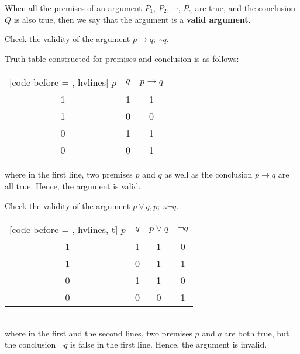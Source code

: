 \documentclass{report}
\newcounter{example}
\begin{document}
When all the premises of an argument $P_1$, $P_2$, $\cdots$, $P_n$ are true,
and the conclusion $Q$ is also true, then we say that the argument is a
\textbf{valid argument}. \vspace{0.5cm}
\begin{example}
    \item Check the validity of the argument $p \rightarrow q;\ \therefore q$.
\end{example}
\begin{solution}
    \item Truth table constructed for premises and conclusion is as follows:
    \begin{center}
        \begin{NiceTabular}{|c|c|c|}[code-before = , hvlines]
            $p$ & $q$ & $p \rightarrow q$ \\
            1   & 1   & 1                 \\
            1   & 0   & 0                 \\
            0   & 1   & 1                 \\
            0   & 0   & 1                 \\
        \end{NiceTabular}
    \end{center}
    where in the first line, two premises $p$ and $q$ as well as the conclusion $p \rightarrow q$ are all true. Hence, the argument is valid.
\end{solution}
\newpage
\begin{example}
    \item Check the validity of the argument $p \lor q, p;\ \therefore \neg q$.
\end{example}
\begin{solution}
    \item
    \begin{NiceTabular}{|c|c|c|c|}[code-before = , hvlines, t]
        $p$ & $q$ & $p \lor q$ & $\neg q$ \\
        1   & 1   & 1          & 0        \\
        1   & 0   & 1          & 1        \\
        0   & 1   & 1          & 0        \\
        0   & 0   & 0          & 1        \\
    \end{NiceTabular}\\

    where in the first and the second lines, two premises $p$ and $q$ are both
    true, but the conclusion $\neg q$ is false in the first line. Hence, the
    argument is invalid.
\end{solution}
\end{document}
